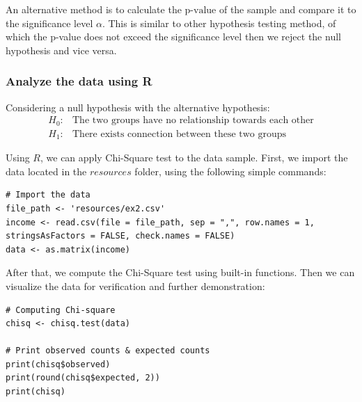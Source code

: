 \documentclass[a4paper]{article}
\numberwithin{equation}{section}
\begin{document}
An alternative method is to calculate the \(\text{p-value}\) of the sample and compare it to the significance level \( \alpha \). This is similar to other hypothesis testing method, of which the p-value does not exceed the significance level then we reject the null hypothesis and vice versa.

\subsubsection{Analyze the data using R}\label{p2:anal}
Considering a null hypothesis with the alternative hypothesis:
\begin{align*}
  H_0: & \text{The two groups have no relationship towards each other} \\
  H_1: & \text{There exists connection between these two groups}
\end{align*}

Using \(R\), we can apply Chi-Square test to the data sample. First, we import the data located in the \(resources\) folder, using the following simple commands:
\begin{mdframed}[leftline=false,rightline=false,backgroundcolor=magenta!10,nobreak=true]
  \begin{verbatim}
# Import the data
file_path <- 'resources/ex2.csv'
income <- read.csv(file = file_path, sep = ",", row.names = 1, stringsAsFactors = FALSE, check.names = FALSE)
data <- as.matrix(income)
  \end{verbatim}
\end{mdframed}

After that, we compute the Chi-Square test using built-in functions. Then we can visualize the data for verification and further demonstration:
\begin{mdframed}[leftline=false,rightline=false,backgroundcolor=magenta!10,nobreak=true]
  \begin{verbatim}
# Computing Chi-square
chisq <- chisq.test(data)

# Print observed counts & expected counts
print(chisq$observed)
print(round(chisq$expected, 2))
print(chisq)
  \end{verbatim}
\end{mdframed}
\end{document}
